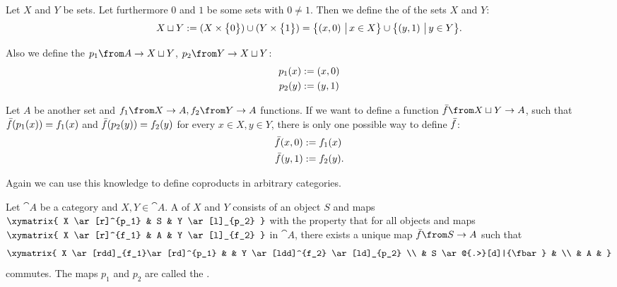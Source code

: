 \begin{example}
  \label{ex:coprod:dunion}
  Let $X$ and $Y$ be sets.
  Let furthermore $0$ and $1$ be some sets with $0 \ne 1$.
  Then we define the  of the sets $X$ and $Y$:
  $$X \sqcup Y := (X \times \bigl \{ 0 \bigr \}) \cup (Y \times \bigl \{ 1 \bigr \}) = \bigl \{ \left( x , 0 \right) \,\big|\, x \in X \bigr \} \cup \bigl \{ \left( y , 1 \right) \,\big|\, y \in Y \bigr \}.$$

  Also we define the  $p_1 \from A \to X \dunion Y$, $p_2 \from Y \to X \dunion Y$:
  \begin{alignat*}{2}
    p_1(x) &:= \left( x , 0 \right) \\
    p_2(y) &:= \left( y , 1 \right)
  \end{alignat*}

  Let $A$ be another set and $f_1 \from X \to A, f_2 \from Y \to A$ functions.
  If we want to define a function $\fbar \from X \dunion Y \to A$, such that
  $\bar{f}(p_1(x)) = f_1(x)$ and $\bar{f}(p_2(y)) = f_2(y)$ for every $x \in X, y \in Y$,
  there is only one possible way to define $\bar{f}$:
  \begin{alignat*}{2}
    \bar{f}(x, 0) &:= f_1(x) \\
    \bar{f}(y, 1) &:= f_2(y).
  \end{alignat*}
\end{example}

Again we can use this knowledge to define coproducts in arbitrary categories.

\begin{definition}[Coproduct]
  \label{def:coproduct}
  Let $\cat{A}$ be a category and $X, Y \in \cat{A}$.
  A  of $X$ and $Y$ consists of an object $S$ and maps
  $ \xymatrix{
    X \ar[r]^{p_1} & S & Y \ar[l]_{p_2}
  } $
  with the property that for all objects and maps
  $ \xymatrix{
    X \ar[r]^{f_1} & A & Y \ar[l]_{f_2}
  } $
  in $\cat{A}$, there exists a unique map $\fbar\from S \to A$ such that
  \[ \xymatrix{
    X \ar[rdd]_{f_1}\ar[rd]^{p_1} & & Y \ar[ldd]^{f_2} \ar[ld]_{p_2} \\
    & S \ar@{.>}[d]|{\fbar} & \\
    & A &
  } \]
  commutes. The maps $p_1$ and $p_2$ are called the .
\end{definition}


